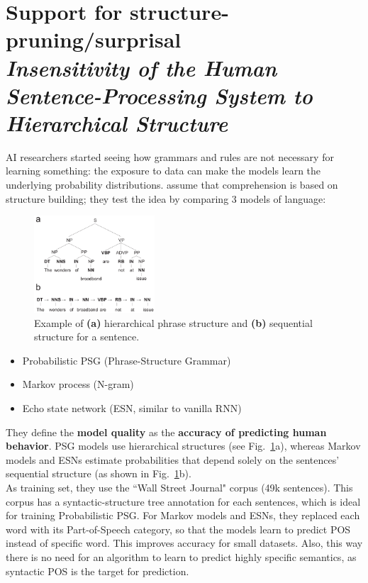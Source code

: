 \section[Support for structure-pruning/surprisal]{Support for structure-pruning/surprisal\\ \textit{Insensitivity of the Human Sentence-Processing System to Hierarchical Structure}\\
}
AI researchers started seeing how grammars and rules are not necessary for learning something: the exposure to data can make the models learn the underlying probability distributions. \cite{frank} assume that comprehension is based on structure building; they test the idea by comparing 3 models of language:

\begin{figure}
  \centering
  \includegraphics[width=0.4\textwidth]{images/frank.png}
  \caption{Example of \textbf{(a)} hierarchical phrase structure and \textbf{(b)} sequential structure for a sentence.}
  \label{fig:frank}
\end{figure}
\begin{itemize}
    \item Probabilistic PSG (Phrase-Structure Grammar)
    \item Markov process (N-gram)
    \item Echo state network (ESN, similar to vanilla RNN)
\end{itemize}
They define the \textbf{model quality} as the \textbf{accuracy of predicting human behavior}. PSG models use hierarchical structures (see Fig.~\ref{fig:frank}a), whereas Markov models and ESNs estimate probabilities that depend solely on the sentences' sequential structure (as shown in Fig.~\ref{fig:frank}b).\\

As training set, they use the ``Wall Street Journal" corpus (49k sentences). This corpus has a syntactic-structure tree annotation for each sentences, which is ideal for training Probabilistic PSG.
For Markov models and ESNs, they replaced each word with its Part-of-Speech category, so that the models learn to predict POS instead of specific word. This improves accuracy for small 
datasets. Also, this way there is no need for an algorithm to learn to predict highly specific semantics, as syntactic POS is the target for prediction.

